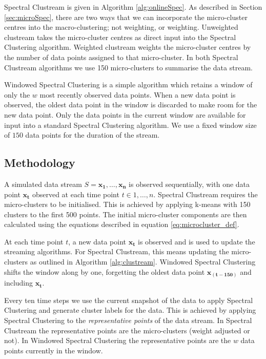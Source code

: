 Spectral Clustream is given in Algorithm \ref{alg:onlineSpec}. As described in Section \ref{sec:microSpec}, there are two  ways that we can incorporate the micro-cluster centres into the macro-clustering; not weighting, or weighting. Unweighted clustream takes the micro-cluster centres as direct input into the Spectral Clustering algorithm. Weighted clustream weights the micro-cluster centres by the number of data points assigned to that micro-cluster. In both Spectral Clustream algorithms we use 150 micro-clusters to summarise the data stream.

Windowed Spectral Clustering is a simple algorithm which retains a window of only the  $w$  most recently observed data points. When a new data point is observed, the oldest data point in the window is discarded to make room for the new data point. Only the data points in the current window are available for input into a standard Spectral Clustering algorithm. We use a fixed window size of $150$ data points for the duration of the stream.

\subsection{Methodology}
\label{sec:methodology}

A simulated data stream $S = {\boldsymbol{x_1},\ldots, \boldsymbol{x_n}  }$ is observed sequentially, with one data point $\boldsymbol{x_t}$ observed at each time point $t \in 1, \ldots, n$. Spectral Clustream requires the micro-clusters to be initialised.  This is achieved by applying k-means with 150 clusters to the first 500 points. The initial micro-cluster components are then calculated using the equations described in equation \eqref{eq:microcluster_def}. %

At each time point $t$, a new data point  $\boldsymbol{x_t}$ is observed and is used to update the streaming algorithms. For Spectral Clustream, this means updating the micro-clusters as outlined in Algorithm \ref{alg:clustream}. Windowed Spectral Clustering shifts the window along by one, forgetting the oldest data point $\boldsymbol{x_{(t-150)}}$ and including $\boldsymbol{x_t}$. 

Every ten time steps we use the current snapshot of the data to apply Spectral Clustering and generate cluster labels for the data. This is achieved by applying Spectral Clustering to the \textit{representative points} of the data stream. In Spectral Clustream the representative points are the micro-clusters (weight adjusted or not). In Windowed Spectral Clustering the representative points are the $w$ data points currently in the window.


